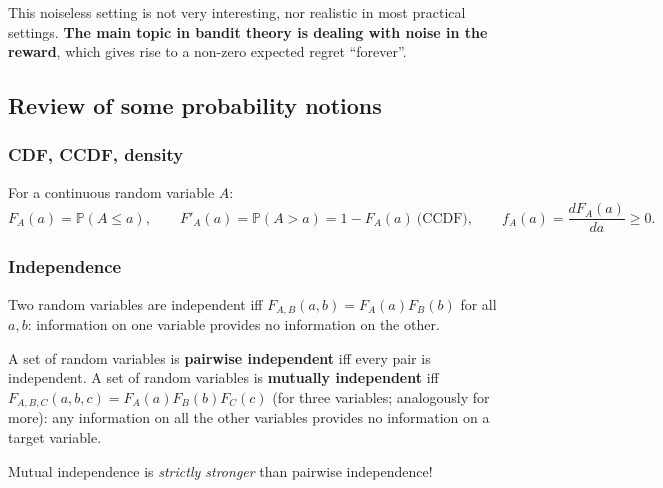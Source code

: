 This noiseless setting is not very interesting, nor realistic in most practical settings. \textbf{The main topic in bandit theory is dealing with noise in the reward}, which gives rise to a non-zero expected regret ``forever''.

\subsection{Review of some probability notions}

\subsubsection*{CDF, CCDF, density}

For a continuous random variable $A$:
\[
F_A(a) = \mathbb{P}(A \leq a), \qquad F'_A(a) = \mathbb{P}(A > a) = 1 - F_A(a) \ \text{(CCDF)}, \qquad f_A(a) = \frac{dF_A(a)}{da} \geq 0.
\]

\subsubsection*{Independence}

Two random variables are independent iff $F_{A,B}(a,b) = F_A(a)F_B(b)$ for all $a,b$: information on one variable provides no information on the other.

A set of random variables is \textbf{pairwise independent} iff every pair is independent. A set of random variables is \textbf{mutually independent} iff $F_{A,B,C}(a,b,c) = F_A(a)F_B(b)F_C(c)$ (for three variables; analogously for more): any information on all the other variables provides no information on a target variable.

\begin{remark}
Mutual independence is \emph{strictly stronger} than pairwise independence!
\end{remark}

